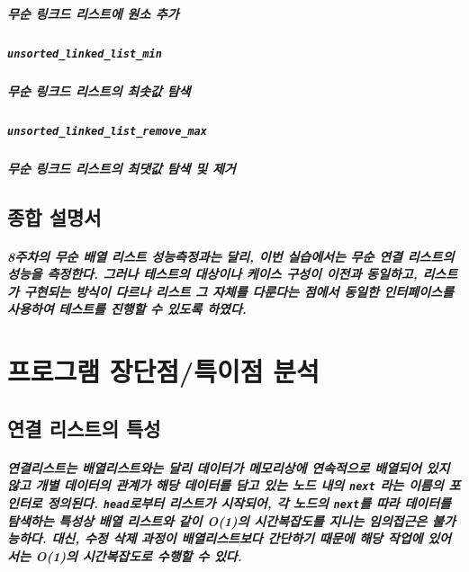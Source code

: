 \documentclass[UTF8, a4paper]{report}
\begin{document}
            \paragraph{%
                \normalfont 무순 링크드 리스트에 원소 추가
            }

            \paragraph{\texttt{unsorted\_linked\_list\_min       }}
            \paragraph{%
                \normalfont 무순 링크드 리스트의 최솟값 탐색
            }

            \paragraph{\texttt{unsorted\_linked\_list\_remove\_max}}
            \paragraph{%
                \normalfont 무순 링크드 리스트의 최댓값 탐색 및 제거
            }

        \section{종합 설명서}

            \paragraph{%
                \normalfont 8주차의 무순 배열 리스트 성능측정과는 달리, 이번 실습에서는 무순 연결 리스트의 성능을 측정한다. 그러나 테스트의 대상이나 케이스 구성이 이전과 동일하고, 리스트가 구현되는 방식이 다르나 리스트 그 자체를 다룬다는 점에서 동일한 인터페이스를 사용하여 테스트를 진행할 수 있도록 하였다.
            }
            
    \chapter{프로그램 장단점/특이점 분석}
            \section{연결 리스트의 특성}
            \paragraph{%
                \normalfont 연결리스트는 배열리스트와는 달리 데이터가 메모리상에 연속적으로 배열되어 있지 않고 개별 데이터의 관계가 해당 데이터를 담고 있는 노드 내의 \texttt{next} 라는 이름의 포인터로 정의된다. \texttt{head}로부터 리스트가 시작되어, 각 노드의 \texttt{next}를 따라 데이터를 탐색하는 특성상 배열 리스트와 같이 O(1)의 시간복잡도를 지니는 임의접근은 불가능하다. 대신, 수정 삭제 과정이 배열리스트보다 간단하기 때문에 해당 작업에 있어서는 O(1)의 시간복잡도로 수행할 수 있다.
            }   
\end{document}
